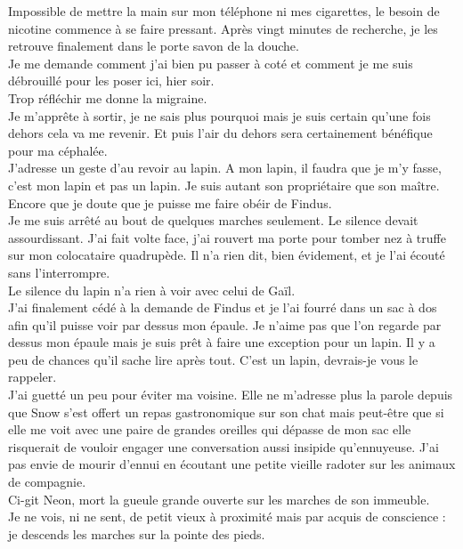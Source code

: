 Impossible de mettre la main sur mon téléphone ni mes cigarettes, le besoin de nicotine commence à se faire pressant. Après vingt minutes de recherche, je les retrouve finalement dans le porte savon de la douche. \\
Je me demande comment j'ai bien pu passer à coté et comment je me suis débrouillé pour les poser ici, hier soir. \\
Trop réfléchir me donne la migraine. \\

Je m’apprête à sortir, je ne sais plus pourquoi mais je suis certain qu'une fois dehors cela va me revenir. Et puis l'air du dehors sera certainement bénéfique pour ma céphalée. \\
J'adresse un geste d'au revoir au lapin. A mon lapin, il faudra que je m'y fasse, c'est mon lapin et pas un lapin. Je suis autant son propriétaire que son maître. Encore que je doute que je puisse me faire obéir de Findus. \\

Je me suis arrêté au bout de quelques marches seulement. Le silence devait assourdissant. J'ai fait volte face, j'ai rouvert ma porte pour tomber nez à truffe sur mon colocataire quadrupède. Il n'a rien dit, bien évidement, et je l'ai écouté sans l’interrompre. \\
Le silence du lapin n'a rien à voir avec celui de Gaïl. \\

J'ai finalement cédé à la demande de Findus et je l'ai fourré dans un sac à dos afin qu'il puisse voir par dessus mon épaule. Je n'aime pas que l'on regarde par dessus mon épaule mais je suis prêt à faire une exception pour un lapin. Il y a peu de chances qu'il sache lire après tout. C'est un lapin, devrais-je vous le rappeler. \\

J'ai guetté un peu pour éviter ma voisine. Elle ne m'adresse plus la parole depuis que Snow s'est offert un repas gastronomique sur son chat mais peut-être que si elle me voit avec une paire de grandes oreilles qui dépasse de mon sac elle risquerait de vouloir engager une conversation aussi insipide qu'ennuyeuse. J'ai pas envie de mourir d'ennui en écoutant une petite vieille radoter sur les animaux de compagnie. \\
Ci-git Neon, mort la gueule grande ouverte sur les marches de son immeuble.\\
Je ne vois, ni ne sent, de petit vieux à proximité mais par acquis de conscience : je descends les marches sur la pointe des pieds.